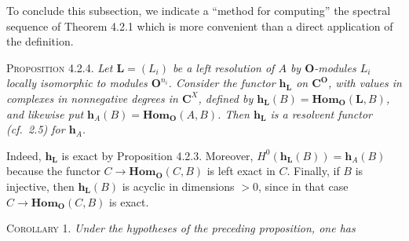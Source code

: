 To conclude this subsection, we indicate a ``method for computing'' the spectral
sequence of Theorem 4.2.1 which is more convenient than a direct application
of the definition.

\textsc{Proposition 4.2.4.} \textit{Let
$\mathbf{L}=(L_i)$ be a left resolution of $A$ by ${\mathbf O}$-modules $L_i$ locally
isomorphic to modules ${\mathbf O}^{n_i}$. Consider the functor
$\mathbf{h}_{\mathbf{L}}$ on $\mathbf C^{\mathbf O}$, with values in complexes in nonnegative
degrees in $\mathbf C^X$, defined by
$\mathbf{h}_{\mathbf{L}}(B)=\mathbf{Hom}_{\mathbf O}(\mathbf{L},B)$, and likewise put
$\mathbf{h}_A(B)=\mathbf{Hom}_{\mathbf O}(A,B)$. Then $\mathbf{h}_{\mathbf{L}}$ is a
resolvent functor \textup{(}cf.\ \textup{2.5)} for $\mathbf{h}_A$.}

Indeed, $\mathbf{h}_{\mathbf{L}}$ is exact by Proposition 4.2.3. Moreover,
$H^0(\mathbf{h}_{\mathbf{L}}(B))=\mathbf{h}_A(B)$ because the functor
$C\to\mathbf{Hom}_{\mathbf O}(C,B)$ is left exact in $C$. Finally, if $B$ is
injective, then $\mathbf{h}_{\mathbf{L}}(B)$ is acyclic in dimensions $>0$,
since in that case $C\to\mathbf{Hom}_{\mathbf O}(C,B)$ is exact.

\textsc{Corollary 1.} \textit{Under the hypotheses of the preceding
proposition, one has}

